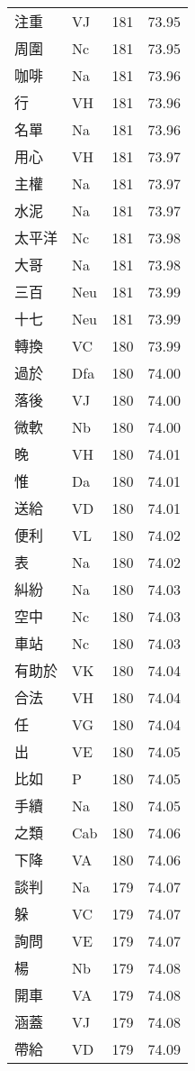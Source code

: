 \documentclass[twocolumn]{book}
\begin{document}
\begin{supertabular}{llrr}
注重 & VJ & 181 &  73.95\\
周圍 & Nc & 181 &  73.95\\
咖啡 & Na & 181 &  73.96\\
行 & VH & 181 &  73.96\\
名單 & Na & 181 &  73.96\\
用心 & VH & 181 &  73.97\\
主權 & Na & 181 &  73.97\\
水泥 & Na & 181 &  73.97\\
太平洋 & Nc & 181 &  73.98\\
大哥 & Na & 181 &  73.98\\
三百 & Neu & 181 &  73.99\\
十七 & Neu & 181 &  73.99\\
轉換 & VC & 180 &  73.99\\
過於 & Dfa & 180 &  74.00\\
落後 & VJ & 180 &  74.00\\
微軟 & Nb & 180 &  74.00\\
晚 & VH & 180 &  74.01\\
惟 & Da & 180 &  74.01\\
送給 & VD & 180 &  74.01\\
便利 & VL & 180 &  74.02\\
表 & Na & 180 &  74.02\\
糾紛 & Na & 180 &  74.03\\
空中 & Nc & 180 &  74.03\\
車站 & Nc & 180 &  74.03\\
有助於 & VK & 180 &  74.04\\
合法 & VH & 180 &  74.04\\
任 & VG & 180 &  74.04\\
出 & VE & 180 &  74.05\\
比如 & P & 180 &  74.05\\
手續 & Na & 180 &  74.05\\
之類 & Cab & 180 &  74.06\\
下降 & VA & 180 &  74.06\\
談判 & Na & 179 &  74.07\\
躲 & VC & 179 &  74.07\\
詢問 & VE & 179 &  74.07\\
楊 & Nb & 179 &  74.08\\
開車 & VA & 179 &  74.08\\
涵蓋 & VJ & 179 &  74.08\\
帶給 & VD & 179 &  74.09\\

\end{supertabular}
\end{document}
